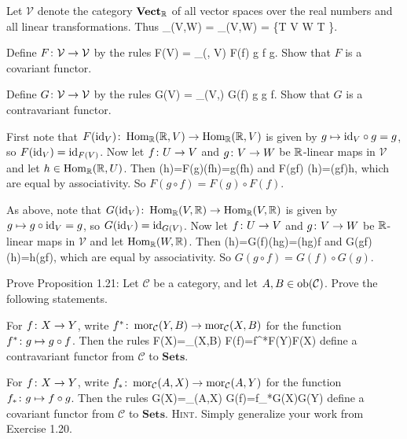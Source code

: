 \bx
Let $\mathcal{V}$ denote the category $\mathbf{Vect}_{\mathbb{R}}$ of all vector spaces over the real numbers and all linear transformations. Thus
\bse
\mor_{}(V,W) = \Hom_{\R}(V,W) = \{T \cl V \to W \mid T \}.
\ese
\ben[label=(\alph*)]
\item Define $F \colon \mathcal{V} \to\mathcal{V}$ by the rules
\bse
F(V) = \Hom_{\R}(\R, V) \qquad {} \qquad F(f) \cl g 	\mapsto f \circ g.
\ese
Show that $F$ is a covariant functor.
\item Define $G \colon \mathcal{V} \to\mathcal{V}$ by the rules
\bse
G(V) = \Hom_{\R}(V,\R) \qquad {} \qquad G(f) \cl g 	\mapsto g \circ f.
\ese
Show that $G$ is a contravariant functor.
\een
\ex

\bs
\ben[label=(\alph*)]
\item First note that $F(\mathrm{id}_V)\colon  \operatorname{Hom}_{\mathbb{R}}(\mathbb{R}, V)\to  \operatorname{Hom}_{\mathbb{R}}(\mathbb{R}, V)$ is given by $g\mapsto \mathrm{id}_V\circ g=g$, so $F(\mathrm{id}_V)=\mathrm{id}_{F(V)}$. Now let $f\colon U\to V$ and $g\colon V\to W$ be $\mathbb{R}$-linear maps in $\mathcal{V}$ and let $h\in \operatorname{Hom}_{\mathbb{R}}(\mathbb{R}, U)$. 
Then
\bse
[F(g)\circ F(f)] (h)=F(g)(f\circ h)=g\circ (f\circ h)
\ese
and
\bse
F(g\circ f) (h)=(g\circ f)\circ h,
\ese
which are equal by associativity. So $F(g\circ f) =F(g)\circ F(f)$.
\item As above, note that $G(\mathrm{id}_V)\colon \operatorname{Hom}_{\mathbb{R}}(V,\mathbb{R})\to \operatorname{Hom}_{\mathbb{R}}(V,\mathbb{R})$ is given by $g\mapsto g\circ \mathrm{id}_V=g$, so $G(\mathrm{id}_V)=\mathrm{id}_{G(V)}$. Now let $f\colon U\to V$ and $g\colon V\to W$ be $\mathbb{R}$-linear maps in $\mathcal{V}$ and let $\operatorname{Hom}_{\mathbb{R}}(W,\mathbb{R})$. Then
\bse
[G(f)\circ g(g)] (h)=G(f)(h\circ g)=(h\circ g)\circ f
\ese
and
\bse
G(g\circ f) (h)=h\circ (g\circ f),
\ese
which are equal by associativity. So $G(g\circ f) =G(f)\circ G(g)$.
\een
\es

\addtocounter{exercise}{1}
\bp
Prove Proposition 1.21: Let $\mathcal{C}$ be a category, and let $A,B\in \operatorname{ob}(\mathcal{C})$. Prove the following statements.
\ben[label=(\alph*)]
\item For $f\colon X\to Y$, write $f^*\colon\operatorname{mor}_{\mathcal{C}}(Y,B)\to\operatorname{mor}_{\mathcal{C}}(X,B)$ for the function $f^*\colon g\mapsto g\circ f$. Then the rules
\bse
F(X)=\mor_{}(X,B) \qquad {} \qquad F(f)=f^*\cl F(Y)\to F(X)
\ese
define a contravariant functor from $\mathcal{C}$ to $\mathbf{Sets}$.
\item For $f\colon X\to Y$, write $f_*\colon\operatorname{mor}_{\mathcal{C}}(A,X)\to\operatorname{mor}_{\mathcal{C}}(A,Y)$ for the function $f_*\colon g\mapsto f\circ g$. Then the rules
\bse
G(X)=\mor_{}(A,X) \qquad {} \qquad G(f)=f_*\cl G(X)\to G(Y)
\ese
define a covariant functor from $\mathcal{C}$ to $\mathbf{Sets}$.
\een
{\scshape Hint}. Simply generalize your work from Exercise 1.20.
\ep

